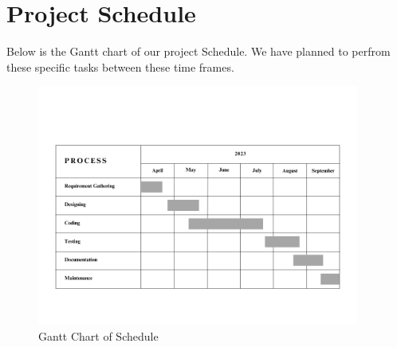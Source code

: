 \section{Project Schedule}
Below is the Gantt chart of our project Schedule. We have planned to perfrom these specific tasks between these time frames.
\begin{figure}[H]
    \centering
        \includegraphics[width=400px]{Diagrams/Gantt_Chart.png}
    \caption{Gantt Chart of Schedule}
\end{figure}
